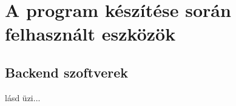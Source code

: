 \section{A program készítése során felhasznált eszközök}
\label{sec:softwares}

\subsection{Backend szoftverek}

lásd üzi...